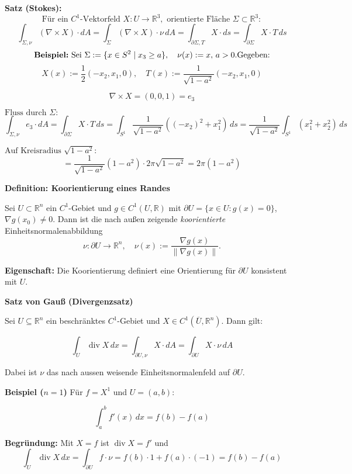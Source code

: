 \textbf{Satz (Stokes):} \\
\[
\text{Für ein } C^1\text{-Vektorfeld } X : U \to \mathbb{R}^3, \text{ orientierte Fläche } \Sigma \subset \mathbb{R}^3: 
\]
\[
\int_{\Sigma, \nu} (\nabla \times X) \cdot dA 
= \int_{\Sigma} (\nabla \times X) \cdot \nu \, dA 
= \int_{\partial \Sigma, T} X \cdot ds 
= \int_{\partial \Sigma} X \cdot T \, ds
\]
\[
\textbf{Beispiel:} \text{ Sei } \Sigma := \{x \in S^2 \mid x_3 \geq a \}, \quad \nu(x) := x, \, a > 0. \\
\text{Gegeben:}
\]
\[
X(x) := \frac{1}{2}(-x_2, x_1, 0), \quad T(x) := \frac{1}{\sqrt{1 - a^2}}(-x_2, x_1, 0)
\]

\[
\nabla \times X = (0, 0, 1) = e_3
\]

$\text{Fluss durch } \Sigma: $
\[
\int_{\Sigma, \nu} e_3 \cdot dA 
= \int_{\partial \Sigma} X \cdot T \, ds 
= \int_{S^1} \frac{1}{\sqrt{1-a^2}} ((-x_2)^2 + x_1^2) \, ds 
= \frac{1}{\sqrt{1 - a^2}} \int_{S^1} (x_1^2 + x_2^2) \, ds
\]

$\text{Auf Kreisradius } \sqrt{1 - a^2}: $
\[
= \frac{1}{\sqrt{1 - a^2}} (1 - a^2) \cdot 2\pi\sqrt{1 - a^2}
= 2\pi (1 - a^2)
\]

\textbf{Definition: Koorientierung eines Randes}

Sei $U \subset \mathbb{R}^n$ ein $C^1$-Gebiet und $g \in C^1(U, \mathbb{R})$ mit $\partial U = \{x \in U : g(x) = 0\}$, $\nabla g(x_0) \neq 0$.  
Dann ist die nach außen zeigende \textit{koorientierte} Einheitsnormalenabbildung
\[
\nu: \partial U \to \mathbb{R}^n, \quad \nu(x) := \frac{\nabla g(x)}{\|\nabla g(x)\|}.
\]

\textbf{Eigenschaft:}  
Die Koorientierung definiert eine Orientierung für $\partial U$ konsistent mit $U$.

\textbf{Satz von Gauß (Divergenzsatz)}

Sei $U \subseteq \mathbb{R}^n$ ein beschränktes $C^1$-Gebiet und $X \in C^1(\overline{U}, \mathbb{R}^n)$. Dann gilt:

\[
\int_U \operatorname{div} X \, dx = \int_{\partial U, \nu} X \cdot dA = \int_{\partial U} X \cdot \nu \, dA
\]

Dabei ist $\nu$ das nach aussen weisende Einheitsnormalenfeld auf $\partial U$.

\textbf{Beispiel ($n=1$)}
Für $f = X^1$ und $U = (a,b)$:

\[
\int_a^b f'(x)\, dx = f(b) - f(a)
\]

\textbf{Begründung:} Mit $X = f$ ist $\operatorname{div} X = f'$ und
\[
\int_U \operatorname{div} X \, dx = \int_{\partial U} f \cdot \nu = f(b)\cdot 1 + f(a)\cdot (-1) = f(b) - f(a)
\]

